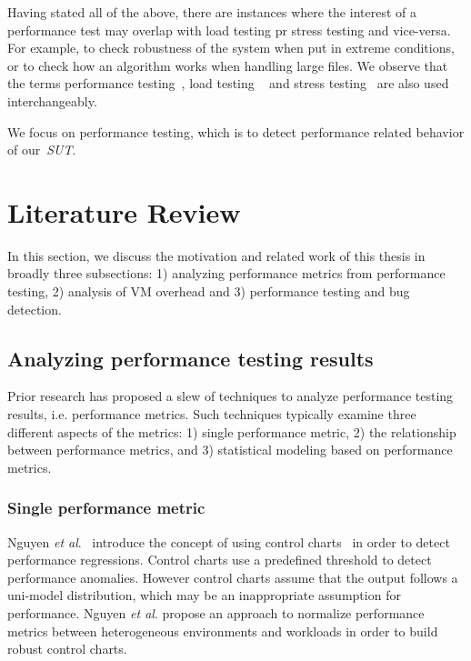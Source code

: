 Having stated all of the above, there are instances where the interest of a performance test may overlap with load testing pr stress testing and vice-versa. For example, to check robustness of the system when put in extreme conditions, or to check how an algorithm works when handling large files. We observe that the terms performance testing~\cite{Dillenseger2009,Menasce02loadtesting,Menasce:2002}, load testing ~\cite{536461,Bayan:2008,perf_load_stress,perf_web} and stress testing~\cite{Bayan:2008,Yang:1996,4020172} are also used interchangeably. 

We focus on performance testing, which is to detect performance related behavior of our~\textit{SUT}.


\section{Literature Review}
\label{sec:related}
In this section, we discuss the motivation and related work of this thesis in broadly three subsections: 1) analyzing performance metrics from performance testing, 2) analysis of VM overhead and 3) performance testing and bug detection.


\subsection{Analyzing performance testing results} 

Prior research has proposed a slew of techniques to analyze performance testing results, i.e. performance metrics. Such techniques typically examine three different aspects of the metrics: 1) single performance metric, 2) the relationship between performance metrics, and 3) statistical modeling based on performance metrics.


\subsubsection{Single performance metric}
\label{sec:relatedindividual}
Nguyen \textit{et al$.$}~\cite{Nguyen:2012:ADP:2188286.2188344} introduce the concept of using control charts~\cite{shewhart1931economic} in order to detect performance regressions. Control charts use a predefined threshold to detect performance anomalies. However control charts assume that the output follows a uni-model distribution, which may be an inappropriate assumption for performance. Nguyen \textit{ et al$.$} propose an approach to normalize performance metrics between heterogeneous environments and workloads in order to build robust control charts. %

